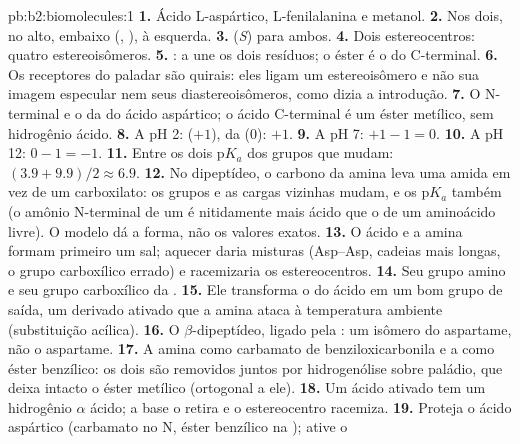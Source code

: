 \begin{solution}{pb:b2:biomolecules:1}
\textbf{1.} Ácido L-aspártico, L-fenilalanina e metanol.
\textbf{2.} Nos dois,  no alto,  embaixo (, ), 
à esquerda.
\textbf{3.} (\textit{S}) para ambos.
\textbf{4.} Dois estereocentros: quatro estereoisômeros.
\textbf{5.} : a  une os dois
resíduos; o éster é o  do C-terminal.
\textbf{6.} Os receptores do paladar são quirais: eles ligam um estereoisômero e não sua imagem
especular nem seus diastereoisômeros, como dizia a introdução.
\textbf{7.} O  N-terminal e o  da  do ácido aspártico; o ácido C-terminal
é um éster metílico, sem hidrogênio ácido.
\textbf{8.} A pH 2:  ($+1$),  da  (0): $+1$.
\textbf{9.} A pH 7: $+1 - 1 = 0$.
\textbf{10.} A pH 12: $0 - 1 = -1$.
\textbf{11.} Entre os dois $\mathrm pK_a$ dos grupos que mudam: $(3.9 + 9.9)/2 \approx 6.9$.
\textbf{12.} No dipeptídeo, o carbono da amina leva uma amida em vez de um carboxilato: os grupos e as
cargas vizinhas mudam, e os $\mathrm pK_a$ também (o amônio N-terminal de um  é nitidamente
mais ácido que o de um aminoácido livre). O modelo dá a forma, não os valores exatos.
\textbf{13.} O ácido e a amina formam primeiro um sal; aquecer daria misturas (Asp--Asp, cadeias mais
longas, o grupo carboxílico errado) e racemizaria os estereocentros.
\textbf{14.} Seu grupo amino e seu grupo carboxílico da .
\textbf{15.} Ele transforma o  do ácido em um bom grupo de saída, um derivado ativado que a amina
ataca à temperatura ambiente (substituição acílica).
\textbf{16.} O $\beta$-dipeptídeo, ligado pela : um isômero do aspartame, não o aspartame.
\textbf{17.} A amina como carbamato de benziloxicarbonila e a  como éster benzílico: os
dois são removidos juntos por hidrogenólise sobre paládio, que deixa intacto o éster metílico
(ortogonal a ele).
\textbf{18.} Um ácido ativado tem um hidrogênio $\alpha$ ácido; a base o retira e o estereocentro
racemiza.
\textbf{19.} Proteja o ácido aspártico (carbamato no N, éster benzílico na ); ative o

\end{solution}
